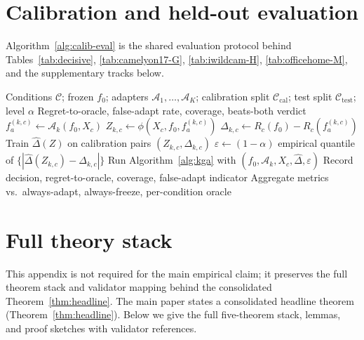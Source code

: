 
\section{Calibration and held-out evaluation}\label{app:calib-eval}
Algorithm~\ref{alg:calib-eval} is the shared evaluation protocol behind Tables~\ref{tab:decisive},
\ref{tab:camelyon17-G}, \ref{tab:iwildcam-H}, \ref{tab:officehome-M}, and the supplementary tracks below.

\begin{algorithm}[t]
\caption{Calibration and held-out evaluation for K-Bound}
\label{alg:calib-eval}
\begin{algorithmic}[1]
\Require Conditions $\mathcal{C}$; frozen $f_0$; adapters $\mathcal{A}_1,\ldots,\mathcal{A}_K$;
  calibration split $\mathcal{C}_{\mathrm{cal}}$; test split $\mathcal{C}_{\mathrm{test}}$; level $\alpha$
\Ensure Regret-to-oracle, false-adapt rate, coverage, beats-both verdict
    \State $f_a^{(k,c)} \leftarrow \mathcal{A}_k(f_0, X_c)$
    \State $Z_{k,c} \leftarrow \phi(X_c, f_0, f_a^{(k,c)})$
    \State $\Delta_{k,c} \leftarrow R_c(f_0) - R_c(f_a^{(k,c)})$
  \EndFor
\EndFor
\State Train $\widehat\Delta(Z)$ on calibration pairs $(Z_{k,c}, \Delta_{k,c})$
\State $\varepsilon \leftarrow (1-\alpha)$ empirical quantile of $\{|\widehat\Delta(Z_{k,c}) - \Delta_{k,c}|\}$
    \State Run Algorithm~\ref{alg:kga} with $(f_0,\mathcal{A}_k,X_c,\widehat\Delta,\varepsilon)$
    \State Record decision, regret-to-oracle, coverage, false-adapt indicator
  \EndFor
\EndFor
\State Aggregate metrics vs.\ always-adapt, always-freeze, per-condition oracle
\end{algorithmic}
\end{algorithm}

\section{Full theory stack}\label{app:theory-full}
This appendix is not required for the main empirical claim; it preserves the full theorem stack
and validator mapping behind the consolidated Theorem~\ref{thm:headline}.
The main paper states a consolidated headline theorem (Theorem~\ref{thm:headline}).
Below we give the full five-theorem stack, lemmas, and proof sketches with validator references.

